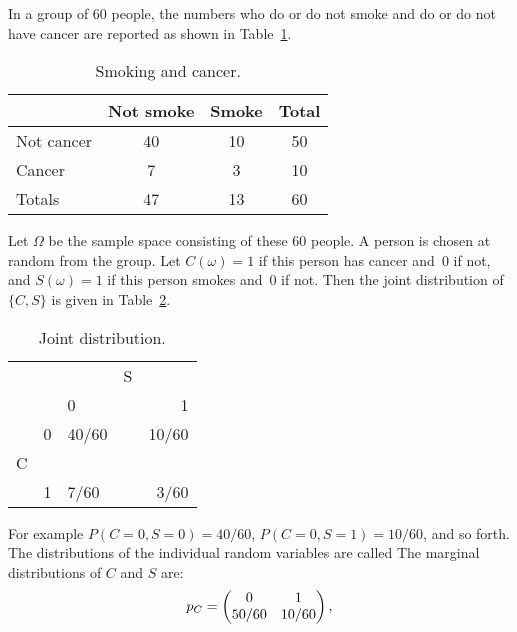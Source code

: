 \begin{example}\label{exam 4.94} In a group of 60 people, the numbers who do or do not smoke
and do or do not have cancer are reported as shown in Table~\ref{table 4.1}.
\begin{table}
\centering
\begin{tabular}{l|cc|c}
             &\hspace{.15in}Not smoke\hspace{.15in}&\hspace{.15in}Smoke\hspace{.15in}&\hspace{.15in}Total\hspace{.15in}  \\ \hline
 Not cancer  & 40             & 10             & 50 \\
 Cancer      & \hspace{.1in}7 &\hspace{.075in}3& 10 \\ \hline
 Totals      & 47          & 13     & 60 \\
\end{tabular}
\caption{Smoking and cancer.}
\label{table 4.1}
\end{table}
Let $\Omega$ be the sample space consisting of these 60 people.  A person is chosen at random
from the group.  Let $C(\omega) = 1$ if this person has cancer and~0 if not, and $S(\omega) =
1$ if this person smokes and~0 if not. Then the joint distribution of $\{C,S\}$ is given in 
Table~\ref{table 4.2}.
\begin{table}
\centering
\begin{tabular}{lr|lcr}
  &    &            &  S      \\
  &    & \hspace{.15in} 0&  & 1\hspace{.15in}\\ \hline
  & 0  &  40/60     &  &10/60  \\ 
C &    &            &  &       \\
  & 1  & \hspace{.1in}7/60  &  &3/60   \\
\end{tabular}
\caption{Joint distribution.}
\label{table 4.2}
\end{table}
\noindent For example $P(C = 0, S = 0) = 40/60$, $P(C = 0, S = 1) = 10/60$, and so forth.  The
distributions of the individual random variables are called   The
marginal distributions of
$C$ and $S$ are:
$$ p_C = \begin{pmatrix} 0     & 1     \cr 50/60 & 10/60 \cr\end{pmatrix},
$$


\end{example}
